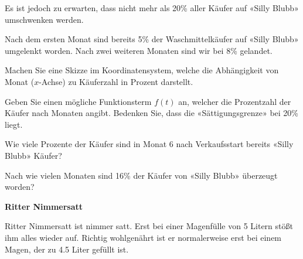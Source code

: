Es ist jedoch zu erwarten, dass nicht mehr als 20\% aller Käufer auf
«Silly Blubb» umschwenken werden.

Nach dem ersten Monat sind bereits 5\% der Waschmittelkäufer auf
«Silly Blubb» umgelenkt worden. Nach zwei weiteren Monaten sind wir
bei 8\% gelandet.


\begin{bbwAufgabenBlock}
\item Machen Sie eine Skizze im Koordinatensystem, welche die
Abhängigkeit von Monat ($x$-Achse) zu Käuferzahl in Prozent darstellt.


\item Geben Sie einen mögliche Funktionsterm $f(t)$ an, welcher die
Prozentzahl der Käufer nach Monaten angibt. Bedenken Sie, dass die
«Sättigungsgrenze» bei 20\% liegt.


\item Wie viele Prozente der Käufer sind in Monat 6 nach Verkaufsstart
  bereits «Silly Blubb» Käufer?
  

\item Nach wie vielen Monaten sind 16\% der Käufer von «Silly Blubb»
  überzeugt worden?


\end{bbwAufgabenBlock}


\platzFuerBerechnungenBisEndeSeite{}



\bbwActAufgabenNr{} \textbf{Ritter Nimmersatt}

\nextBbwAufgabenNummer{}

Ritter Nimmersatt ist nimmer satt. Erst bei einer Magenfülle von
5 Litern stößt ihm alles wieder auf. Richtig wohlgenährt ist er
normalerweise erst bei einem Magen, der zu 4.5 Liter gefüllt ist.

